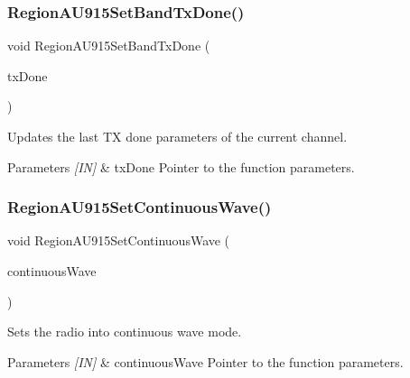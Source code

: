 \subsubsection{\texorpdfstring{Region\+A\+U915\+Set\+Band\+Tx\+Done()}{RegionAU915SetBandTxDone()}}
{\footnotesize\ttfamily void Region\+A\+U915\+Set\+Band\+Tx\+Done (\begin{DoxyParamCaption}\item[{\hyperlink{group__REGION_gad0524aa0673c0814a71e7a4f9cade3fc}{Set\+Band\+Tx\+Done\+Params\+\_\+t} $\ast$}]{tx\+Done }\end{DoxyParamCaption})}



Updates the last TX done parameters of the current channel. 


\begin{DoxyParams}{Parameters}
{\em \mbox{[}\+I\+N\mbox{]}} & tx\+Done Pointer to the function parameters. \\
\hline
\end{DoxyParams}
\mbox{\label{group__REGIONAU915_gae8d539bbf21ee45777245dc1467fa07a}} 
\subsubsection{\texorpdfstring{Region\+A\+U915\+Set\+Continuous\+Wave()}{RegionAU915SetContinuousWave()}}
{\footnotesize\ttfamily void Region\+A\+U915\+Set\+Continuous\+Wave (\begin{DoxyParamCaption}\item[{\hyperlink{group__REGION_gaf39bb5ba06921139c6d17f88a8d518cd}{Continuous\+Wave\+Params\+\_\+t} $\ast$}]{continuous\+Wave }\end{DoxyParamCaption})}



Sets the radio into continuous wave mode. 


\begin{DoxyParams}{Parameters}
{\em \mbox{[}\+I\+N\mbox{]}} & continuous\+Wave Pointer to the function parameters. \\
\hline
\end{DoxyParams}
\mbox{\label{group__REGIONAU915_ga6016e24d99216fad47de5194957c2c01}} 
